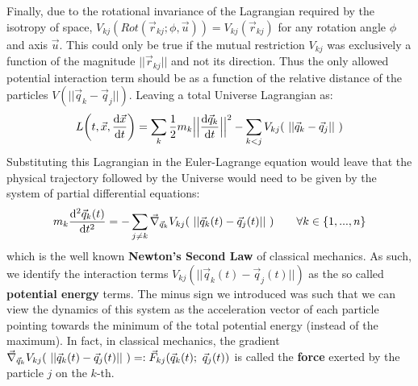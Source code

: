 \documentclass[11pt, a4paper]{article} %
\begin{document}
Finally, due to the rotational invariance of the Lagrangian required by the isotropy of space, $V_{kj}(Rot(\vec{r}_{kj};\phi, \vec{u}))=V_{kj}(\vec{r}_{kj})$ for any rotation angle $\phi$ and axis $\vec{u}$. This could only be true if the mutual restriction $V_{kj}$ was exclusively a function of the magnitude $||\vec{r}_{kj}||$ and not its direction. Thus the only allowed potential interaction term should be as a function of the relative distance of the particles $V(||\vec{q}_k-\vec{q}_j||)$. Leaving a total Universe Lagrangian as:
\begin{equation}
L\qty(t, \vec{x}, \dv{\vec{x}}{t})=\sum_{k}\frac{1}{2} m_k\Big|\Big|\dv{\vec{q}_k}{t}\Big|\Big|^2-\sum_{k<j} V_{kj}(\ ||\vec{q}_k-\vec{q}_j||\ )
\end{equation}
Substituting this Lagrangian in the Euler-Lagrange equation would leave that the physical trajectory followed by the Universe would need to be given by the system of partial differential equations:
\begin{equation}
m_k \dv[2]{\vec{q}_k(t)}{t} = -\sum_{j\neq k}\vec{\nabla}_{\vec{q}_k} V_{kj}\qty(\ ||\vec{q}_k(t)-\vec{q}_j(t)||\ )\quad\quad \forall k\in\{1,...,n\}
\end{equation}
which is the well known {\bf Newton's Second Law} of classical mechanics. As such, we identify the interaction terms $V_{kj}(||\vec{q}_k(t)-\vec{q}_j(t)||)$ as the so called {\bf potential energy} terms. The minus sign we introduced was such that we can view the dynamics of this system as the acceleration vector of each particle pointing towards the minimum of the total potential energy (instead of the maximum). In fact, in classical mechanics, the gradient $\vec{\nabla}_{\vec{q}_k} V_{kj}\qty(\ ||\vec{q}_k(t)-\vec{q}_j(t)||\ )=:\vec{F}_{kj}(\vec{q}_k(t);\ \vec{q}_j(t))$ is called the {\bf force} exerted by the particle $j$ on the $k$-th.



\end{document}
